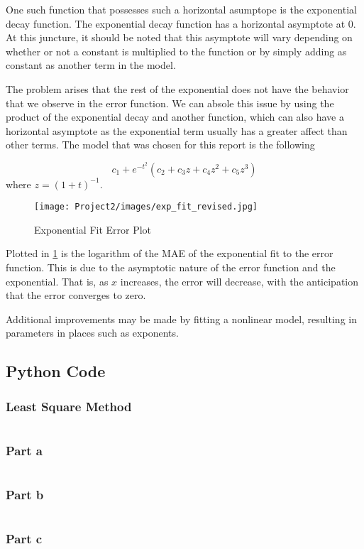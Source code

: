 \documentclass[10pt,a4paper]{article}
\begin{document}
One such function that possesses such a horizontal asumptope is the exponential decay function. The exponential decay function has a horizontal asymptote at $0$. At this juncture, it should be noted that this asymptote will vary depending on whether or not a constant is multiplied to the function or by simply adding as constant as another term in the model. 

The problem arises that the rest of the exponential does not have the behavior that we observe in the error function. We can absole this issue by using the product of the exponential decay and another function, which can also have a horizontal asymptote as the exponential term usually has a greater affect than other terms. The model that was chosen for this report is the following

\begin{equation}
c_1 + e^{-t^2} \left( c_2 + c_3 z + c_4 z^2 + c_5 z^3 \right)
\label{eqn: exponential model}
\end{equation}
where $z = \left( 1 + t \right)^{-1}$.

\begin{figure}[H]
\centering
\texttt{[image: Project2/images/exp\_fit\_revised.jpg]}
\caption{Exponential Fit Error Plot}
\label{fig: experrors}
\end{figure}

Plotted in \cref{fig: experrors} is the logarithm of the MAE of the exponential fit to the error function. This is due to the asymptotic nature of the error function and the exponential. That is, as $x$ increases, the error will decrease, with the anticipation that the error converges to zero.


Additional improvements may be made by fitting a nonlinear model, resulting in parameters in places such as exponents.


\subsection*{Python Code}

\subsubsection{Least Square Method}
\inputminted{python}{code/horner.py}

\subsubsection{Part a}
\inputminted{python}{code/full_poly.py}


\subsubsection{Part b}
\inputminted{python}{code/odd_poly.py}

\subsubsection{Part c}

\end{document}
